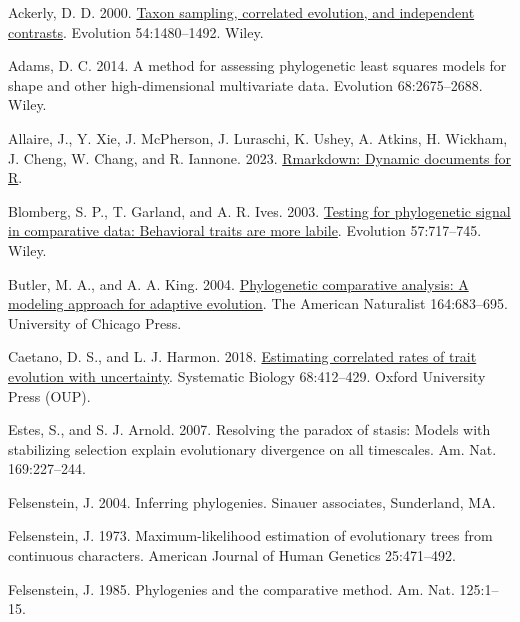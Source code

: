 \documentclass[fleqn,10pt,lineno]{wlpeerj} %
\newlength{\cslhangindent}
\newenvironment{CSLReferences}[2] %
 {\begin{list}{}{%
  \setlength{\itemindent}{0pt}
  \setlength{\leftmargin}{0pt}
  \setlength{\parsep}{0pt}
  \ifodd #1
   \setlength{\leftmargin}{\cslhangindent}
   \setlength{\itemindent}{-1\cslhangindent}
  \fi
  \setlength{\itemsep}{#2\baselineskip}}}
 {\end{list}}
\begin{document}
\label{refs}
\begin{CSLReferences}{1}{0}
Ackerly, D. D. 2000. \href{https://doi.org/10.1111/j.0014-3820.2000.tb00694.x}{Taxon sampling, correlated evolution, and independent contrasts}. Evolution 54:1480--1492. Wiley.

Adams, D. C. 2014. A method for assessing phylogenetic least squares models for shape and other high-dimensional multivariate data. Evolution 68:2675--2688. Wiley.

Allaire, J., Y. Xie, J. McPherson, J. Luraschi, K. Ushey, A. Atkins, H. Wickham, J. Cheng, W. Chang, and R. Iannone. 2023. \href{https://github.com/rstudio/rmarkdown}{{R}markdown: Dynamic documents for {R}}.

Blomberg, S. P., T. Garland, and A. R. Ives. 2003. \href{https://doi.org/10.1111/j.0014-3820.2003.tb00285.x}{Testing for phylogenetic signal in comparative data: Behavioral traits are more labile}. Evolution 57:717--745. Wiley.

Butler, M. A., and A. A. King. 2004. \href{https://doi.org/10.1086/426002}{Phylogenetic comparative analysis: A modeling approach for adaptive evolution}. The American Naturalist 164:683--695. University of Chicago Press.

Caetano, D. S., and L. J. Harmon. 2018. \href{https://doi.org/10.1093/sysbio/syy067}{Estimating correlated rates of trait evolution with uncertainty}. Systematic Biology 68:412--429. Oxford University Press (OUP).

Estes, S., and S. J. Arnold. 2007. Resolving the paradox of stasis: Models with stabilizing selection explain evolutionary divergence on all timescales. Am. Nat. 169:227--244.

Felsenstein, J. 2004. Inferring phylogenies. Sinauer associates, Sunderland, MA.

Felsenstein, J. 1973. Maximum-likelihood estimation of evolutionary trees from continuous characters. American Journal of Human Genetics 25:471--492.

Felsenstein, J. 1985. Phylogenies and the comparative method. Am. Nat. 125:1--15.


\end{CSLReferences}
\end{document}
